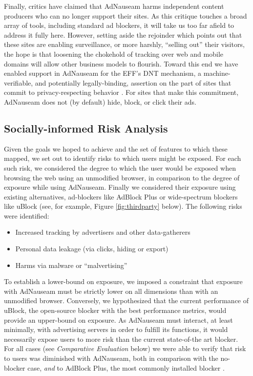 \documentclass[conference]{IEEEtran}
\begin{document}
\indent Finally, critics have claimed that AdNauseam harms independent content producers who can no longer support their sites. As this critique touches a broad array of tools, including standard ad blockers, it will take us too far afield to address it fully here. However, setting aside the rejoinder which points out that these sites are enabling surveillance, or more harshly, “selling out” their visitors, the hope is that loosening the chokehold of tracking over web and mobile domains will allow other business models to flourish. Toward this end we have enabled support in AdNauseam for the EFF's DNT mechanism, a machine-verifiable, and potentially legally-binding, assertion on the part of sites that commit to privacy-respecting behavior \cite{EFF-1}. For sites that make this commitment, AdNauseam does not (by default) hide, block, or click their ads.

\subsection{Socially-informed Risk Analysis}

Given the goals we hoped to achieve and the set of features to which these mapped, we set out to identify risks to which users might be exposed. For each such risk, we considered the degree to which the user would be exposed when browsing the web using an unmodified browser, in comparison to the degree of exposure while using AdNauseam. Finally we considered their exposure using existing alternatives, ad-blockers like AdBlock Plus \cite{AdBlock} or wide-spectrum blockers like uBlock \cite{Gorhill}(see, for example, Figure \ref{fig:thirdparty} below). The following risks were identified:

\begin{itemize}
\item Increased tracking by advertisers and other data-gatherers
\item Personal data leakage (via clicks, hiding or export)
\item Harms via malware or “malvertising”
\end{itemize}

\noindent To establish a lower-bound on exposure, we imposed a constraint that exposure with AdNauseam must be strictly lower on all dimensions than with an unmodified browser. Conversely, we hypothesized that the current performance of uBlock, the open-source blocker with the best performance metrics, would provide an upper-bound on exposure. As AdNauseam must interact, at least minimally, with advertising servers in order to fulfill its functions, it would necessarily expose users to more risk than the current state-of-the art blocker. For all cases (see \emph{Comparative Evaluation} below) we were able to verify that risk to users was diminished with AdNauseam, both in comparison with the no-blocker case, \emph{and} to AdBlock Plus, the most commonly installed blocker \cite{PageFair}.
\end{document}
